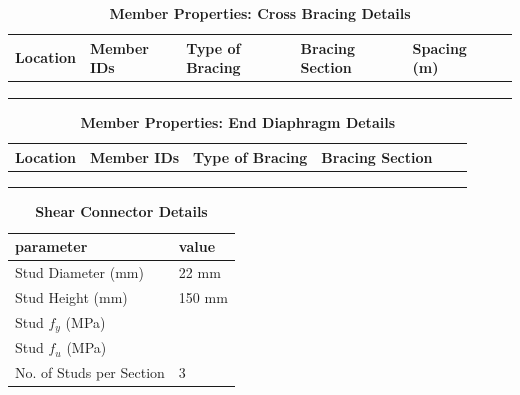 \documentclass[12pt,a4paper]{report}
\numberwithin{table}{chapter}
\numberwithin{figure}{chapter}
\begin{document}
\newpage

\vspace{0.4em}
\setlength{\tabcolsep}{4pt}
\setlength\LTleft{0pt}
\setlength\LTright{\fill}

\begin{longtable}{|L{2.2cm}|L{2.2cm}|L{3.0cm}|L{2.5cm}|C{1.8cm}|C{1.8cm}|}
\caption{\textbf{Member Properties: Cross Bracing Details}}
\hline
\textbf{Location} & \textbf{Member IDs} & \textbf{Type of Bracing} & \textbf{Bracing Section} & \textbf{Spacing (m)} \\
\hline
 &  &  &  &  \\[6pt]
\hline
 &  &  &  &  \\[6pt]
\hline
 &  &  &  &  \\[6pt]
\hline
\end{longtable}

\vspace{0.4em}
\noindent
\setlength{\tabcolsep}{4pt}
\setlength\LTleft{0pt}
\setlength\LTright{\fill}

\begin{longtable}{|L{2.2cm}|L{2.2cm}|L{3.0cm}|L{2.5cm}|C{1.8cm}|C{1.8cm}|}
\caption{\textbf{Member Properties: End Diaphragm Details}}
\hline
\textbf{Location} & \textbf{Member IDs} & \textbf{Type of Bracing} & \textbf{Bracing Section} \\
\hline
 &  &  &  \\[6pt]
\hline
 &  &  &  \\[6pt]
\hline
 &  &  &  \\[6pt]
\hline
\end{longtable}



\label{subsec:shear-connectors}

\vspace{2.2em}

\vspace{0.4em}
\begin{longtable}{|L{5.5cm}|p{10.0cm}|}
\caption{\textbf{Shear Connector Details}}
\hline
\textbf{parameter} & \textbf{value} \\
\hline
\textnormal{Stud Diameter (mm)} & 22 mm \\[6pt]
\hline
\textnormal{Stud Height (mm)} & 150 mm \\[6pt]
\hline
\textnormal{Stud $f_y$ (MPa)} &  \\[6pt]
\hline
\textnormal{Stud $f_u$ (MPa)} &  \\[6pt]
\hline
\textnormal{No. of Studs per Section} & 3 \\[6pt]
\hline
\end{longtable}
\end{document}
